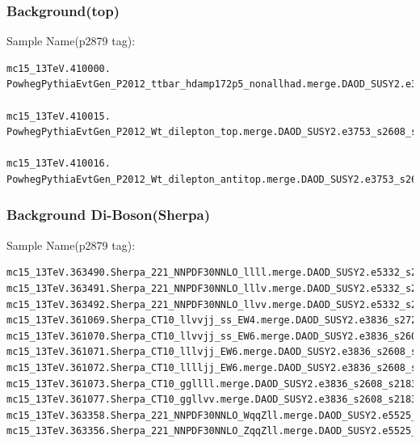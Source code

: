 \documentclass[mathserif,serif]{beamer}
\begin{document}
\begin{frame}[fragile]
\frametitle{Background(top)}
\small
Sample Name(p2879 tag):
\tiny
\begin{verbatim}
mc15_13TeV.410000.
PowhegPythiaEvtGen_P2012_ttbar_hdamp172p5_nonallhad.merge.DAOD_SUSY2.e3698_s2608_s2183_r7725_r7676_p2879

mc15_13TeV.410015.
PowhegPythiaEvtGen_P2012_Wt_dilepton_top.merge.DAOD_SUSY2.e3753_s2608_s2183_r7725_r7676_p2879

mc15_13TeV.410016.
PowhegPythiaEvtGen_P2012_Wt_dilepton_antitop.merge.DAOD_SUSY2.e3753_s2608_s2183_r7725_r7676_p2879
\end{verbatim}
\end{frame}

\begin{frame}[fragile]
\frametitle{Background Di-Boson(Sherpa)}
\small
Sample Name(p2879 tag):
\tiny
\begin{verbatim}
mc15_13TeV.363490.Sherpa_221_NNPDF30NNLO_llll.merge.DAOD_SUSY2.e5332_s2726_r7772_r7676_p2879
mc15_13TeV.363491.Sherpa_221_NNPDF30NNLO_lllv.merge.DAOD_SUSY2.e5332_s2726_r7772_r7676_p2879
mc15_13TeV.363492.Sherpa_221_NNPDF30NNLO_llvv.merge.DAOD_SUSY2.e5332_s2726_r7772_r7676_p2879
mc15_13TeV.361069.Sherpa_CT10_llvvjj_ss_EW4.merge.DAOD_SUSY2.e3836_s2726_r7772_r7676_p2879
mc15_13TeV.361070.Sherpa_CT10_llvvjj_ss_EW6.merge.DAOD_SUSY2.e3836_s2608_r7772_r7676_p2879
mc15_13TeV.361071.Sherpa_CT10_lllvjj_EW6.merge.DAOD_SUSY2.e3836_s2608_s2183_r7772_r7676_p2879
mc15_13TeV.361072.Sherpa_CT10_lllljj_EW6.merge.DAOD_SUSY2.e3836_s2608_s2183_r7772_r7676_p2879
mc15_13TeV.361073.Sherpa_CT10_ggllll.merge.DAOD_SUSY2.e3836_s2608_s2183_r7772_r7676_p2879
mc15_13TeV.361077.Sherpa_CT10_ggllvv.merge.DAOD_SUSY2.e3836_s2608_s2183_r7772_r7676_p2879
mc15_13TeV.363358.Sherpa_221_NNPDF30NNLO_WqqZll.merge.DAOD_SUSY2.e5525_s2726_r7772_r7676_p2879
mc15_13TeV.363356.Sherpa_221_NNPDF30NNLO_ZqqZll.merge.DAOD_SUSY2.e5525_s2726_r7772_r7676_p2879
\end{verbatim}
\end{frame}
\end{document}
